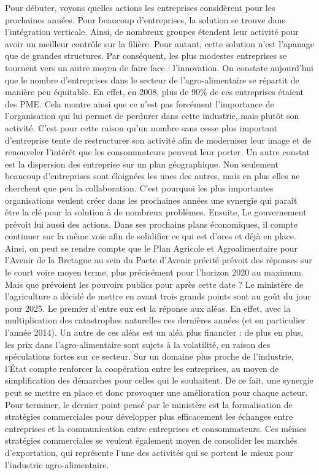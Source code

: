 \documentclass[a4paper,12pt]{report}
\begin{document}
			Pour débuter, voyons quelles actions les entreprises considèrent pour les prochaines années. Pour beaucoup d’entreprises, la solution se trouve dans l’intégration verticale. Ainsi, de nombreux groupes étendent leur activité pour avoir un meilleur contrôle sur la filière. Pour autant, cette solution n’est l’apanage que de grandes structures. Par conséquent, les plus modestes entreprises se tournent vers un autre moyen de faire face : l’innovation. On constate aujourd’hui que le nombre d’entreprises dans le secteur de l’agro-alimentaire se répartit de manière peu équitable. En effet, en 2008, plus de 90\% de ces entreprises étaient des PME\cite{IAAFranceChiffres}. Cela montre ainsi que ce n’est pas forcément l’importance de l’organisation qui lui permet de perdurer dans cette industrie, mais plutôt son activité. C’est pour cette raison qu’un nombre sans cesse plus important d’entreprise tente de restructurer son activité afin de moderniser leur image et de renouveler l’intérêt que les consommateurs peuvent leur porter. Un autre constat est la dispersion des entreprise sur un plan géographique. Non seulement beaucoup d’entreprises sont éloignées les unes des autres, mais en plus elles ne cherchent que peu la collaboration. C’est pourquoi les plus importantes organisations veulent créer dans les prochaines années une synergie qui paraît être la clé pour la solution à de nombreux problèmes.
			Ensuite, Le gouvernement prévoit lui aussi des actions. Dans ses prochains plans économiques, il compte continuer sur la même voie afin de solidifier ce qui est d’ores et déjà en place. Ainsi, on peut se rendre compte que le Plan Agricole et Agroalimentaire pour l’Avenir de la Bretagne au sein du Pacte d’Avenir précité prévoit des réponses sur le court voire moyen terme, plus précisément pour l’horizon 2020 au maximum. Mais que prévoient les pouvoirs publics pour après cette date ? Le ministère de l’agriculture a décidé de mettre en avant trois grands points sont au goût du jour pour 2025\cite{AvenirFiliereAgricole2025}. Le premier d’entre eux est la réponse aux aléas. En effet, avec la multiplication des catastrophes naturelles ces dernières années (et en particulier l’année 2014). Un autre de ces aléas est un aléa plus financier : de plus en plus, les prix dans l’agro-alimentaire sont sujets à la volatilité, en raison des spéculations fortes sur ce secteur. Sur un domaine plus proche de l’industrie, l’État compte renforcer la coopération entre les entreprises, au moyen de simplification des démarches pour celles qui le souhaitent. De ce fait, une synergie peut se mettre en place et donc provoquer une amélioration pour chaque acteur. Pour terminer, le dernier point pensé par le ministère est la formalisation de stratégies commerciales pour développer plus efficacement les échanges entre entreprises et la communication entre entreprises et consommateurs. Ces mêmes stratégies commerciales se veulent également moyen de consolider les marchés d’exportation, qui représente l’une des activités qui se portent le mieux pour l’industrie agro-alimentaire.
			
\end{document}
